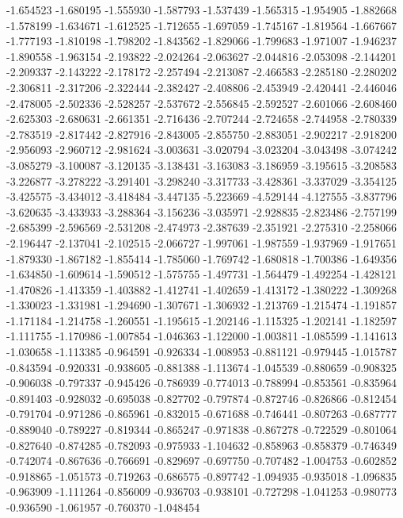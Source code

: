 -1.654523
-1.680195
-1.555930
-1.587793
-1.537439
-1.565315
-1.954905
-1.882668
-1.578199
-1.634671
-1.612525
-1.712655
-1.697059
-1.745167
-1.819564
-1.667667
-1.777193
-1.810198
-1.798202
-1.843562
-1.829066
-1.799683
-1.971007
-1.946237
-1.890558
-1.963154
-2.193822
-2.024264
-2.063627
-2.044816
-2.053098
-2.144201
-2.209337
-2.143222
-2.178172
-2.257494
-2.213087
-2.466583
-2.285180
-2.280202
-2.306811
-2.317206
-2.322444
-2.382427
-2.408806
-2.453949
-2.420441
-2.446046
-2.478005
-2.502336
-2.528257
-2.537672
-2.556845
-2.592527
-2.601066
-2.608460
-2.625303
-2.680631
-2.661351
-2.716436
-2.707244
-2.724658
-2.744958
-2.780339
-2.783519
-2.817442
-2.827916
-2.843005
-2.855750
-2.883051
-2.902217
-2.918200
-2.956093
-2.960712
-2.981624
-3.003631
-3.020794
-3.023204
-3.043498
-3.074242
-3.085279
-3.100087
-3.120135
-3.138431
-3.163083
-3.186959
-3.195615
-3.208583
-3.226877
-3.278222
-3.291401
-3.298240
-3.317733
-3.428361
-3.337029
-3.354125
-3.425575
-3.434012
-3.418484
-3.447135
-5.223669
-4.529144
-4.127555
-3.837796
-3.620635
-3.433933
-3.288364
-3.156236
-3.035971
-2.928835
-2.823486
-2.757199
-2.685399
-2.596569
-2.531208
-2.474973
-2.387639
-2.351921
-2.275310
-2.258066
-2.196447
-2.137041
-2.102515
-2.066727
-1.997061
-1.987559
-1.937969
-1.917651
-1.879330
-1.867182
-1.855414
-1.785060
-1.769742
-1.680818
-1.700386
-1.649356
-1.634850
-1.609614
-1.590512
-1.575755
-1.497731
-1.564479
-1.492254
-1.428121
-1.470826
-1.413359
-1.403882
-1.412741
-1.402659
-1.413172
-1.380222
-1.309268
-1.330023
-1.331981
-1.294690
-1.307671
-1.306932
-1.213769
-1.215474
-1.191857
-1.171184
-1.214758
-1.260551
-1.195615
-1.202146
-1.115325
-1.202141
-1.182597
-1.111755
-1.170986
-1.007854
-1.046363
-1.122000
-1.003811
-1.085599
-1.141613
-1.030658
-1.113385
-0.964591
-0.926334
-1.008953
-0.881121
-0.979445
-1.015787
-0.843594
-0.920331
-0.938605
-0.881388
-1.113674
-1.045539
-0.880659
-0.908325
-0.906038
-0.797337
-0.945426
-0.786939
-0.774013
-0.788994
-0.853561
-0.835964
-0.891403
-0.928032
-0.695038
-0.827702
-0.797874
-0.872746
-0.826866
-0.812454
-0.791704
-0.971286
-0.865961
-0.832015
-0.671688
-0.746441
-0.807263
-0.687777
-0.889040
-0.789227
-0.819344
-0.865247
-0.971838
-0.867278
-0.722529
-0.801064
-0.827640
-0.874285
-0.782093
-0.975933
-1.104632
-0.858963
-0.858379
-0.746349
-0.742074
-0.867636
-0.766691
-0.829697
-0.697750
-0.707482
-1.004753
-0.602852
-0.918865
-1.051573
-0.719263
-0.686575
-0.897742
-1.094935
-0.935018
-1.096835
-0.963909
-1.111264
-0.856009
-0.936703
-0.938101
-0.727298
-1.041253
-0.980773
-0.936590
-1.061957
-0.760370
-1.048454
